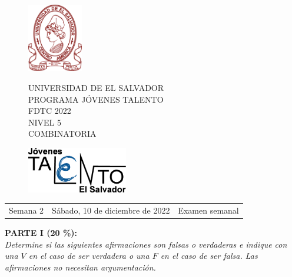 \documentclass[12pt]{article}
\newcommand{\tema}{Semana 2}
\newcommand{\fecha}{Sábado, 10 de diciembre de 2022}
\newcommand{\sesion}{Examen semanal}
\begin{document}
\thispagestyle{empty}

\begin{figure}[h] 
	\begin{minipage}[b]{0.26\textwidth}
		\begin{center}
			\includegraphics[height=3cm]{Logos/UES.png}
			\par\end{center}
	\end{minipage} 
	\begin{minipage}[b]{0.46\textwidth}
		\begin{center}
			UNIVERSIDAD DE EL SALVADOR\\ [0.1cm]
			PROGRAMA JÓVENES TALENTO\\ [0.1cm]
	        FDTC 2022\\ [0.1cm]
                NIVEL 5\\ [0.1cm]
			COMBINATORIA 
			\par\end{center}
	\end{minipage} 
	\begin{minipage}[b]{0.05\textwidth}
		\begin{center}
			\includegraphics[height=2cm]{Logos/LOGO PJT.png}
			\par\end{center}
	\end{minipage}
\end{figure}

\begin{center}
    \begin{tabular}{p{4.5cm} p{7cm} p{4.5cm}}
        \tema & \centering\fecha & \hfill\sesion
    \end{tabular}
\end{center}



{\bf PARTE I (20 \%):}\\
\textit{Determine si las siguientes afirmaciones son falsas o verdaderas e indique con una $V$ en el caso de ser verdadera o una $F$ en el caso de ser falsa. Las afirmaciones no necesitan argumentación.}
\end{document}
